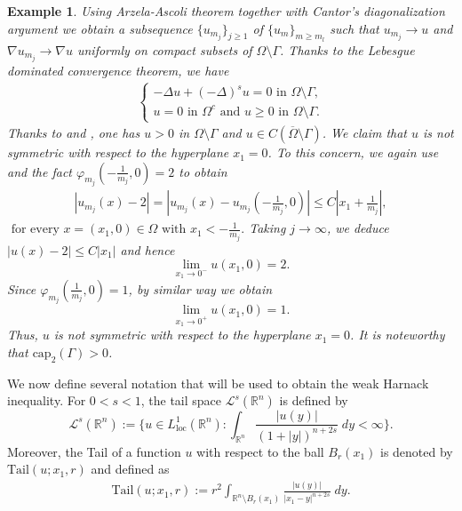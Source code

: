 \documentclass[11pt, notitlepage]{article}
\def\R{\mathbb{R}}
\newtheorem{Example}{Example}
\begin{document}
{\begin{Example}
Using Arzela-Ascoli theorem together with Cantor's diagonalization argument we obtain a subsequence $\{u_{m_j}\}_{j\geq 1}$ of $\{u_m\}_{m\geq m_l}$ such that $u_{m_j}\to u$ and $\nabla u_{m_j}\to \nabla u$ uniformly on compact subsets of $\Omega\setminus\Gamma$. Thanks to the Lebesgue dominated convergence theorem, we have 
\begin{align}
        \begin{cases}
            -\Delta u+(-\Delta)^s u=0 \mbox{ in }\Omega\setminus\Gamma,\\
            u=0\mbox{ in }\Omega^c \mbox{ and } u\geq 0\mbox{ in }\Omega\setminus\Gamma.
        \end{cases}
    \end{align}
Thanks to \cite[Theorem 1.3]{ValdinociCPDE} and \cite[Theorem 1.6]{ValdinociJDE25}, one has $u>0$ in $\Omega\setminus\Gamma$ and $u\in C(\overline{\Omega}\setminus\Gamma)$. We claim that $u$ is not symmetric with respect to the hyperplane $x_1=0$. To this concern, we again use \cite[Theorem 1.6]{ValdinociJDE25} and the fact $\varphi_{m_j}(-\frac{1}{m_j},0)=2$ to obtain 
\begin{align}
    |u_{m_j}(x)-2|=|u_{m_j}(x)-u_{m_j}(-\frac{1}{m_j},0)|\leq C|x_1
+\frac{1}{m_j}|,
\end{align}
$\mbox{ for every }x=(x_1,0)\in\Omega \mbox{ with }x_1<-\frac{1}{m_j}.$ Taking $j\to\infty$, we deduce
$|u(x)-2|\leq C|x_1|$ and hence $$\lim_{x_1\to 0^-}u(x_1,0)=2.$$
Since $\varphi_{m_j}(\frac{1}{m_j},0)=1$, by similar way we obtain $$\lim_{x_1\to 0^+}u(x_1,0)=1.$$
Thus, $u$ is not symmetric with respect to the hyperplane $x_1=0$. It is noteworthy that $\mathrm{cap}_2(\Gamma)>0$.
\end{Example}

We now define several notation that will be used to obtain the weak Harnack inequality. For $0<s<1$, the tail space $\mathcal{L}^s(\R^n)$ is defined by 
$$\mathcal{L}^s(\R^n):=\{u\in L^1_{\mathrm{loc}}(\R^n): \int_{\R^n} \frac{|u(y)|}{(1+|y|)^{n+2s}}\;dy<\infty\}.$$
Moreover, the Tail of a function $u$ with respect to the ball $B_r(x_1)$ is denoted by $\mathrm{Tail}(u;x_1,r)$ and defined as 
\begin{align}\label{Tail}
    \mathrm{Tail}(u;x_1,r):=r^2\int_{\R^n\setminus {B_r(x_1)}}\frac{|u(y)|}{|x_1-y|^{n+2s}}\;dy.
\end{align}

}
\end{document}
